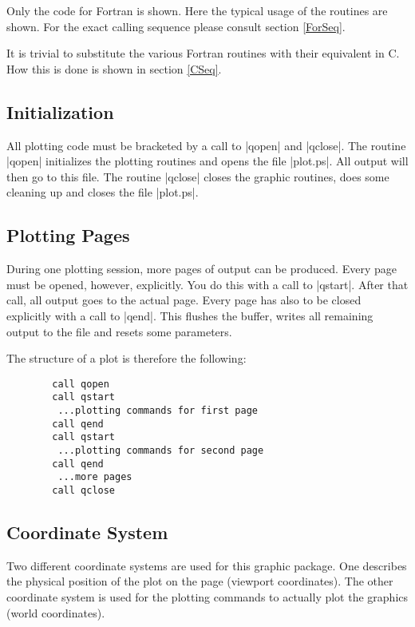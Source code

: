 \documentclass{article}
\begin{document}
Only the code for Fortran is shown. Here the typical usage of the
routines are shown. For the exact calling sequence please consult
section \ref{ForSeq}.

It is trivial to substitute the various Fortran routines with their
equivalent in C.  How this is done is shown in section \ref{CSeq}.

\subsection{Initialization}


All plotting code must be bracketed by a call to |qopen| and |qclose|.
The routine |qopen| initializes the plotting routines and opens the
file |plot.ps|. All output will then go to this file. The routine
|qclose| closes the graphic routines, does some cleaning up and closes
the file |plot.ps|.


\subsection{Plotting Pages}


During one plotting session, more pages of output can be produced.
Every page must be opened, however, explicitly. You do this with a call
to |qstart|. After that call, all output goes to the actual page.
Every page has also to be closed explicitly with a call to |qend|.
This flushes the buffer, writes all remaining output to the file and
resets some parameters.

The structure of a plot is therefore the following:

\begin{verbatim}
        call qopen
        call qstart
         ...plotting commands for first page
        call qend
        call qstart
         ...plotting commands for second page
        call qend
         ...more pages
        call qclose
\end{verbatim}


\subsection{Coordinate System}


Two different coordinate systems are used for this graphic package.
One describes the physical position of the plot on the page (viewport
coordinates). The other coordinate system is used for the plotting
commands to actually plot the graphics (world coordinates).
\end{document}

